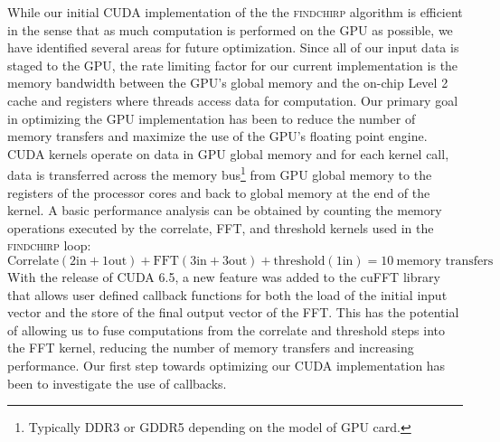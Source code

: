While our initial CUDA implementation of the the \textsc{findchirp} algorithm
is efficient in the sense that as much computation is performed on the GPU as
possible, we have identified several areas for future optimization. 
Since all of our input data is staged to the GPU, the rate limiting factor for
our current implementation is the memory bandwidth between the GPU's global
memory and the on-chip Level 2 cache and registers where threads access data
for computation.  Our primary goal in optimizing the GPU implementation has
been to reduce the number of memory transfers and maximize the use of the
GPU's floating point engine.  CUDA kernels operate on data in GPU global
memory and for each kernel call, data is transferred across the memory
bus\footnote{Typically DDR3 or GDDR5 depending on the model of GPU card.} from
GPU global memory to the registers of the processor cores and back to global
memory at the end of the kernel.  A basic performance analysis can be obtained by
counting the memory operations executed by the correlate, FFT, and threshold
kernels used in the \textsc{findchirp} loop:
\begin{equation}
\textrm{Correlate} (2 \textrm{in}+1 \textrm{out}) + \textrm{FFT} (3 \textrm{in}+3 \textrm{out}) + \textrm{threshold} (1 \textrm{in})  = 10 \ \textrm{memory transfers}
\end{equation}
With the release of CUDA 6.5, a new feature was added to the cuFFT
library that allows user defined callback functions for both the load of the
initial input vector and the store of the final output vector of the FFT.
This has the potential of allowing us to fuse computations from the correlate
and threshold steps into the FFT kernel, reducing the number of memory
transfers and increasing performance. Our first step towards optimizing our
CUDA implementation has been to investigate the use of callbacks.

